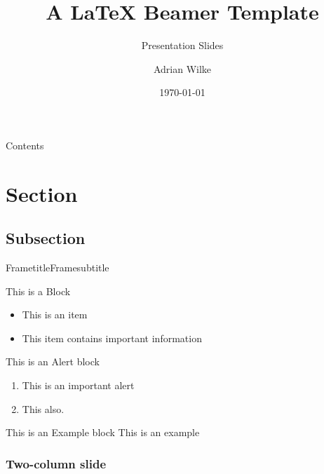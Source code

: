 \documentclass{beamer}
\author[A.~Wilke]{Adrian Wilke}
\institute[]{DICE Group\\Paderborn University}
\title[Beamer Template]{A LaTeX Beamer Template}
\subtitle{Presentation Slides}
\date{\today}
\begin{document}
{ 
	\frame{\titlepage}
}\addtocounter{framenumber}{-1}

\begin{frame}{Contents}
	\tableofcontents
\end{frame}

\section{Section}
\subsection{Subsection}

\begin{frame}{Frametitle}{Framesubtitle}
	\begin{block}{This is a Block}
	\begin{itemize}
		\item This is an item
		\item This item contains \alert{important information}
	\end{itemize}
	\end{block}
	\begin{alertblock}{This is an Alert block}
		\begin{enumerate}
		\item This is an important alert
		\item This also.
	\end{enumerate}
	\end{alertblock}
	\begin{exampleblock}{This is an Example block}
		This is an example 
	\end{exampleblock}
\end{frame}

\begin{frame}
	\frametitle{Two-column slide}
	\begin{columns}
	\lipsum[23]
	\lipsum[4]
	\end{columns}
\end{frame}
\end{document}
